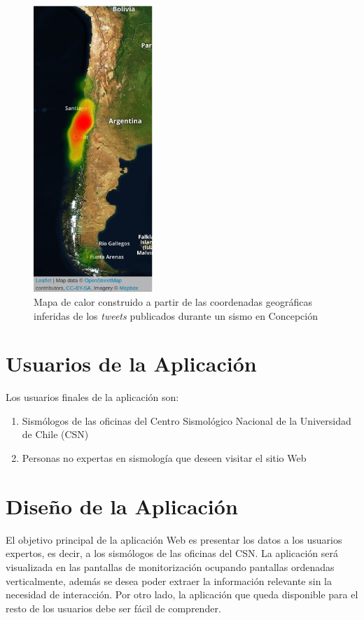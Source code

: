 	\begin{figure}[!ht]
	  \centering
	  \includegraphics[trim={0 0 0 0}, clip, width=0.4\textwidth]{imagenes/heatmap.png}
	  \caption{Mapa de calor construido a partir de las coordenadas geográficas inferidas de los \textit{tweets} publicados durante un sismo en Concepción}
	\label{fig:heatmap}
	\end{figure}
  	

\section{Usuarios de la Aplicación}

Los usuarios finales de la aplicación son:

\begin{enumerate}
\item Sismólogos de las oficinas del Centro Sismológico Nacional de la Universidad de Chile (CSN)
\item Personas no expertas en sismología que deseen visitar el sitio Web
\end{enumerate}

\section{Diseño de la Aplicación}

El objetivo principal de la aplicación Web es presentar los datos a los usuarios expertos, es decir, a los sismólogos de las oficinas del CSN. 
%
La aplicación será visualizada en las pantallas de monitorización ocupando pantallas ordenadas verticalmente, además se desea poder extraer la información relevante sin la necesidad de interacción.
%
Por otro lado, la aplicación que queda disponible para el resto de los usuarios debe ser fácil de comprender. 


